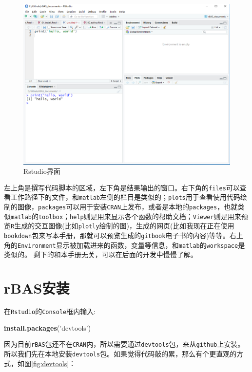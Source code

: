 \documentclass[]{ctexbook}
\newenvironment{Shaded}{\begin{snugshade}}{\end{snugshade}}
\newcommand{\KeywordTok}[1]{\textcolor[rgb]{0.13,0.29,0.53}{\textbf{#1}}}
\newcommand{\StringTok}[1]{\textcolor[rgb]{0.31,0.60,0.02}{#1}}
\newcommand{\NormalTok}[1]{#1}
\begin{document}
\begin{figure}

{\centering \includegraphics[width=0.8\linewidth]{img/Rstudio} 

}

\caption{Rstudio界面}\label{fig:rstudioface}
\end{figure}

左上角是撰写代码脚本的区域，左下角是结果输出的窗口。右下角的\texttt{files}可以查看工作路径下的文件，和\texttt{matlab}左侧的栏目是类似的；\texttt{plots}用于查看使用代码绘制的图像，\texttt{packages}可以用于安装\texttt{CRAN}上发布，或者是本地的\texttt{packages}，也就类似\texttt{matlab}的\texttt{toolbox}；\texttt{help}则是用来显示各个函数的帮助文档；\texttt{Viewer}则是用来预览\texttt{R}生成的交互图像(比如\texttt{plotly}绘制的图)，生成的网页(比如我现在正在使用\texttt{bookdown}包来写本手册，那就可以预览生成的\texttt{gitbook}电子书的内容)等等。右上角的\texttt{Environment}显示被加载进来的函数，变量等信息，和\texttt{matlab}的\texttt{workspace}是类似的。
剩下的和本手册无关，可以在后面的开发中慢慢了解。

\section{rBAS安装}\label{rBASinstall}

在\texttt{Rstudio}的\texttt{Console}框内输入:

\begin{Shaded}
\begin{Highlighting}[]
\KeywordTok{install.packages}\NormalTok{(}\StringTok{'devtools'}\NormalTok{)}
\end{Highlighting}
\end{Shaded}

因为目前\texttt{rBAS}包还不在\texttt{CRAN}内，所以需要通过\texttt{devtools}包，来从\texttt{github}上安装。所以我们先在本地安装\texttt{devtools}包。如果觉得代码敲的累，那么有个更直观的方式，如图\ref{fig:devtools}：
\end{document}
